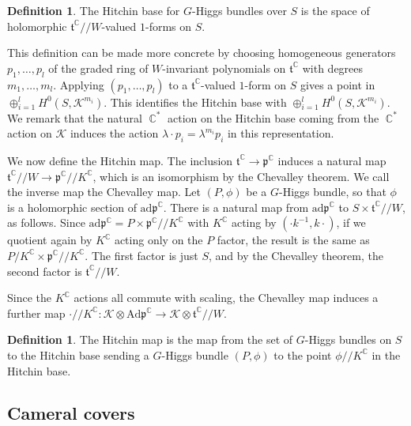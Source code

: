 \documentclass[10pt]{amsart}
\newcommand{\p}{\mathfrak{p}}
\newcommand{\ft}{\mathfrak{t}}
\theoremstyle{definition}
\newtheorem{defn}[thm]{Definition}
\DeclareMathOperator{\C}{\mathbb{C}}
\begin{document}
\begin{defn}
    The Hitchin base for $G$-Higgs bundles over $S$ is the space of holomorphic $\ft^{\C}//W$-valued $1$-forms on $S$.
\end{defn}

This definition can be made more concrete by choosing homogeneous generators $p_1, \ldots, p_l$ of the graded ring of $W$-invariant polynomials on $\ft^{\C}$ with degrees $m_1, \ldots, m_l$. Applying $(p_1,\dots, p_l)$ to a $\ft^{\C}$-valued $1$-form on $S$ gives a point in $\oplus_{i = 1}^l H^0(S, \mathcal{K}^{m_i})$. This identifies the Hitchin base with $\oplus_{i = 1}^l H^0(S, \mathcal{K}^{m_i})$. We remark that the natural $\C^*$ action on the Hitchin base coming from the $\C^*$ action on $\mathcal{K}$ induces the action $\lambda \cdot p_i = \lambda^{m_i}p_i$ in this representation.

We now define the Hitchin map. The inclusion $\ft^{\C} \to \p^{\C}$ induces a natural map $\ft^{\C}//W \to \p^{\C}//K^{\C}$, which is an isomorphism by the Chevalley theorem. We call the inverse map the Chevalley map. Let $(P,\phi)$ be a $G$-Higgs bundle, so that $\phi$ is a holomorphic section of $\mathrm{ad}\p^{\C}$. There is a natural map from $\mathrm{ad}\p^{\C}$ to $S \times \ft^{\C}//W$, as follows.
Since $\mathrm{ad}\p^{\C} = P \times \p^{\C} // K^{\C}$ with $K^{\C}$ acting by $(\cdot k^{-1}, k \cdot)$, if we quotient again by $K^{\C}$ acting only on the $P$ factor, the result is the same as $P/K^{\C} \times \p^{\C}//K^{\C}$. The first factor is just $S$, and by the Chevalley theorem, the second factor is $\ft^{\C}//W$.

Since the $K^{\C}$ actions all commute with scaling, the Chevalley map induces a further map $\cdot//K^{\C}: \mathcal{K} \otimes \mathrm{Ad}\mathfrak{p}^{\C} \to \mathcal{K} \otimes \ft^{\C}//W$. 

\begin{defn}
    The Hitchin map is the map from the set of $G$-Higgs bundles on $S$ to the Hitchin base sending a $G$-Higgs bundle $(P,\phi)$ to the point $\phi//K^{\C}$ in the Hitchin base.
\end{defn}

\subsection{Cameral covers}\label{sec: cameral covers}
\end{document}
